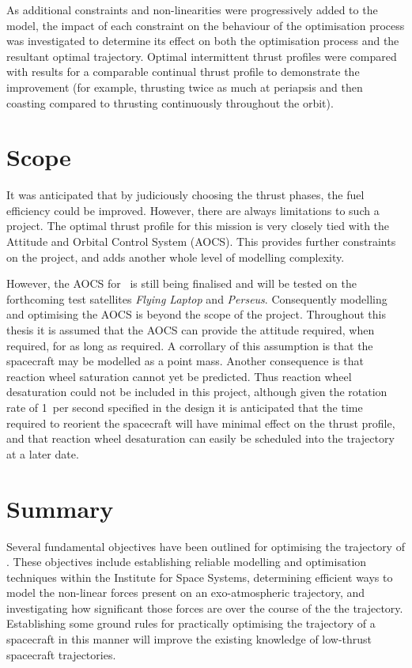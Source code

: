 As additional constraints and non-linearities were progressively added to the model, the impact of each constraint on the behaviour of the optimisation process was investigated to determine its effect on both the optimisation process and the resultant optimal trajectory. Optimal intermittent thrust profiles were compared with results for a comparable continual thrust profile to demonstrate the improvement (for example, thrusting twice as much at periapsis and then coasting compared to thrusting continuously throughout the orbit). 

\section{Scope}

It was anticipated that by judiciously choosing the thrust phases, the fuel efficiency could be improved. However, there are always limitations to such a project. The optimal thrust profile for this mission is very closely tied with the Attitude and Orbital Control System (AOCS). This provides further constraints on the project, and adds another whole level of modelling complexity. 

However, the AOCS for \BW\ is still being finalised and will be tested on the forthcoming test satellites \emph{Flying Laptop} and \emph{Perseus}. Consequently modelling and optimising the AOCS is beyond the scope of the project. Throughout this thesis it is assumed that the AOCS can provide the attitude required, when required, for as long as required. A corrollary of this assumption is that the spacecraft may be modelled as a point mass. Another consequence is that reaction wheel saturation cannot yet be predicted. Thus reaction wheel desaturation could not be included in this project, although given the rotation rate of 1\degrees\ per second specified in the design it is anticipated that the time required to reorient the spacecraft will have minimal effect on the thrust profile, and that reaction wheel desaturation can  easily be scheduled into the trajectory at a later date.

\section{Summary} \label{sec:Objective-summary}

Several fundamental objectives have been outlined for optimising the trajectory of \BW. These objectives include establishing reliable modelling and optimisation techniques within the Institute for Space Systems, determining efficient ways to model the non-linear forces present on an exo-atmospheric trajectory, and investigating how significant those forces are over the course of the the trajectory. Establishing some ground rules for practically optimising the trajectory of a spacecraft in this manner will improve the existing knowledge of low-thrust spacecraft trajectories.